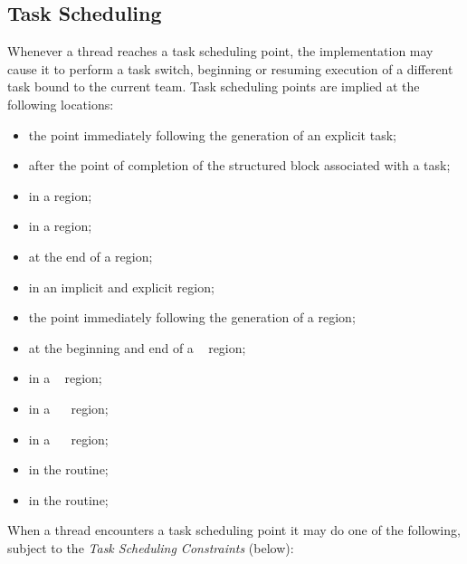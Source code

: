 \subsection{Task Scheduling}
\label{subsec:Task Scheduling}
Whenever a thread reaches a task scheduling point, the implementation may cause it to
perform a task switch, beginning or resuming execution of a different task bound to the
current team. Task scheduling points are implied at the following locations:

\begin{itemize}
\item the point immediately following the generation of an explicit task;

\item after the point of completion of the structured block associated with a task;

\item in a  region;

\item in a  region;

\item at the end of a  region;

\item in an implicit and explicit  region;

\item the point immediately following the generation of a  region;

\item at the beginning and end of a ~ region;

\item in a ~ region;

\item in a ~~ region;

\item in a ~~ region;

\item in the  routine;

\item in the  routine;

\end{itemize}

When a thread encounters a task scheduling point it may do one of the following,
subject to the \emph{Task Scheduling Constraints} (below):


